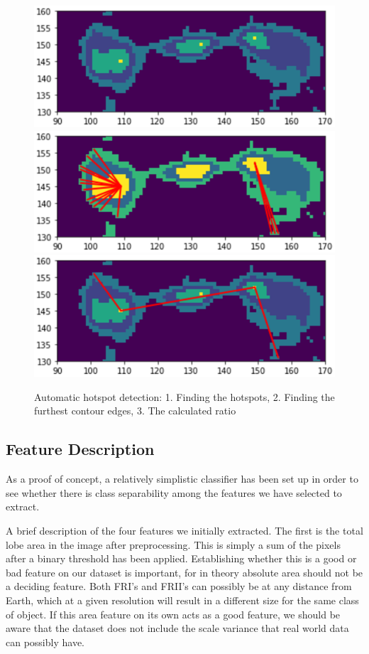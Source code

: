 \documentclass[conference]{IEEEtran}
\begin{document}
\begin{figure}[!h]
    \centering
    \includegraphics[width=0.5 \textwidth]{EPS/hotspots.eps}
    \includegraphics[width=0.5 \textwidth]{EPS/findingfurthestpoint.eps}
    \includegraphics[width=0.5 \textwidth]{EPS/ratioauto.eps}
    
    \caption{Automatic hotspot detection: 1. Finding the hotspots, 2. Finding the furthest contour edges, 3. The calculated ratio}
    \label{fig:hotspotsss}
\end{figure}

\subsection{Feature Description}

As a proof of concept, a relatively simplistic classifier has been set up in order to see whether there is class separability among the features we have selected to extract. 

A brief description of the four features we initially extracted. The first is the total lobe area in the image after preprocessing. This is simply a sum of the pixels after a binary threshold has been applied. Establishing whether this is a good or bad feature on our dataset is important, for in theory absolute area should not be a deciding feature. Both FRI's and FRII's can possibly be at any distance from Earth, which at a given resolution will result in a different size for the same class of object. If this area feature on its own acts as a good feature, we should be aware that the dataset does not include the scale variance that real world data can possibly have.
\end{document}
